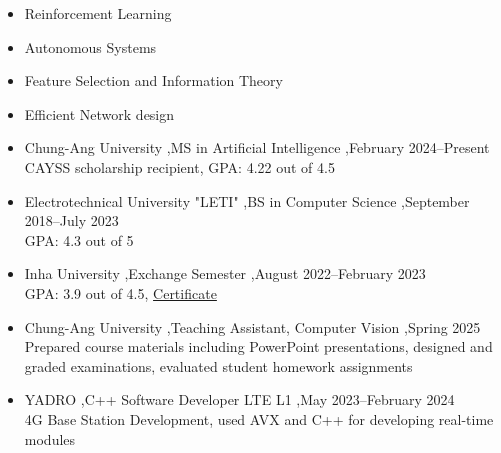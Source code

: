 \documentclass[letterpaper,10pt]{article}
\begin{document}

\begin{itemize}
\item Reinforcement Learning
\item Autonomous Systems
\item Feature Selection and Information Theory
\item Efficient Network design
\end{itemize}


\begin{itemize}
\item Chung-Ang University \sep MS in Artificial Intelligence \sep February 2024--Present\\
CAYSS scholarship recipient, GPA: 4.22 out of 4.5
\item Electrotechnical University "LETI" \sep BS in Computer Science \sep September 2018--July 2023\\
GPA: 4.3 out of 5
\item Inha University \sep Exchange Semester \sep August 2022--February 2023\\
GPA: 3.9 out of 4.5, \href{https://github.com/KhrTim/Certificates/blob/main/KHAIRULOV\%20TIMUR-1.pdf}{Certificate}
\end{itemize}


\begin{itemize}
\item Chung-Ang University \sep Teaching Assistant, Computer Vision \sep Spring 2025\\
Prepared course materials including PowerPoint presentations, designed and graded examinations, evaluated student homework assignments
\end{itemize}


\begin{itemize}
\item YADRO \sep C++ Software Developer LTE L1 \sep May 2023--February 2024\\
4G Base Station Development, used AVX and C++ for developing real-time modules
\end{itemize}

\end{document}

